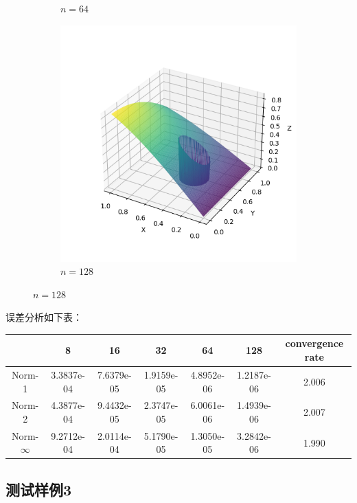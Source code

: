 \documentclass[lang=cn,a4paper,newtx,bibend=bibtex]{elegantpaper}
\begin{document}
\begin{figure}[H]
\begin{subfigure}[b]{0.18\textwidth}
      \caption{$n = 64$}
  \end{subfigure}
  \hfill
  \begin{subfigure}[b]{0.18\textwidth}
      \includegraphics[width=\textwidth]{../../res_bac/res-[data|2-mixed-irregular-e128].png}
      \caption{$n = 128$}
  \end{subfigure}
\end{figure}

误差分析如下表：

\begin{table}[H]
  \centering
  \begin{tabular}{|c|c|c|c|c|c|c|}
  \hline
   & 8 & 16 & 32 & 64 & 128 & convergence rate \\
  \hline
  Norm-1 & 3.3837e-04 & 7.6379e-05 & 1.9159e-05 & 4.8952e-06 & 1.2187e-06 & 2.006 \\
  Norm-2 & 4.3877e-04 & 9.4432e-05 & 2.3747e-05 & 6.0061e-06 & 1.4939e-06 & 2.007 \\
  Norm-$\infty$ & 9.2712e-04 & 2.0114e-04 & 5.1790e-05 & 1.3050e-05 & 3.2842e-06 & 1.990 \\
  \hline
  \end{tabular}
  \end{table}

\subsection{测试样例3}
\end{document}
